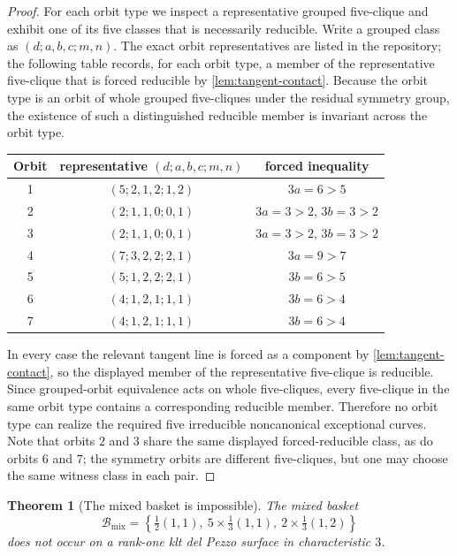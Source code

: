 \documentclass[11pt]{article}
\newtheorem{theorem}{Theorem}[section]
\theoremstyle{definition}
\begin{document}
\begin{proof}
For each orbit type we inspect a representative grouped five-clique and exhibit one of its five classes that is necessarily reducible. Write a grouped class as $(d;a,b,c;m,n)$. The exact orbit representatives are listed in the repository; the following table records, for each orbit type, a member of the representative five-clique that is forced reducible by \cref{lem:tangent-contact}. Because the orbit type is an orbit of whole grouped five-cliques under the residual symmetry group, the existence of such a distinguished reducible member is invariant across the orbit type.

\begin{center}
\begin{tabular}{c|c|c}
\toprule
Orbit & representative $(d;a,b,c;m,n)$ & forced inequality \\
\midrule
1 & $(5;2,1,2;1,2)$ & $3a=6>5$ \\
2 & $(2;1,1,0;0,1)$ & $3a=3>2$, $3b=3>2$ \\
3 & $(2;1,1,0;0,1)$ & $3a=3>2$, $3b=3>2$ \\
4 & $(7;3,2,2;2,1)$ & $3a=9>7$ \\
5 & $(5;1,2,2;2,1)$ & $3b=6>5$ \\
6 & $(4;1,2,1;1,1)$ & $3b=6>4$ \\
7 & $(4;1,2,1;1,1)$ & $3b=6>4$ \\
\bottomrule
\end{tabular}
\end{center}

In every case the relevant tangent line is forced as a component by \cref{lem:tangent-contact}, so the displayed member of the representative five-clique is reducible. Since grouped-orbit equivalence acts on whole five-cliques, every five-clique in the same orbit type contains a corresponding reducible member. Therefore no orbit type can realize the required five irreducible noncanonical exceptional curves. Note that orbits $2$ and $3$ share the same displayed forced-reducible class, as do orbits $6$ and $7$; the symmetry orbits are different five-cliques, but one may choose the same witness class in each pair.
\end{proof}

\begin{theorem}[The mixed basket is impossible]\label{thm:mixed-impossible}
The mixed basket
\[
\mathcal B_{\mathrm{mix}}=\left\{\tfrac12(1,1),\ 5\times\tfrac13(1,1),\ 2\times\tfrac13(1,2)\right\}
\]
does not occur on a rank-one klt del Pezzo surface in characteristic $3$.
\end{theorem}
\end{document}
